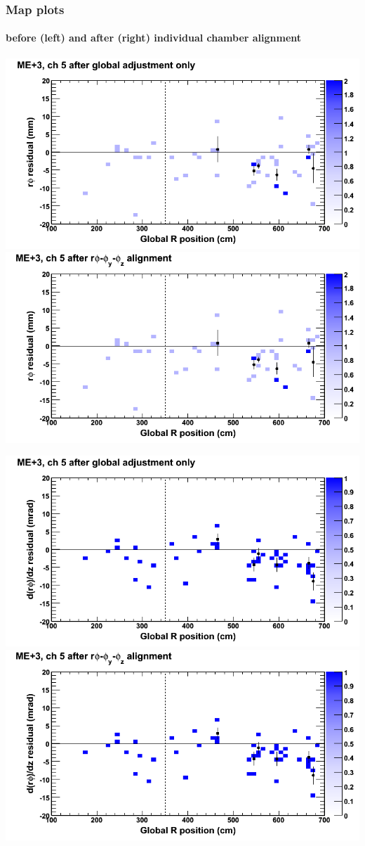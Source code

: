 \documentclass[compress]{beamer}
\begin{document}
\begin{frame}
\frametitle{Map plots}
\framesubtitle{before (left) and after (right) individual chamber alignment}
\includegraphics[width=0.5\linewidth]{ringmapplots_3dof/before_CSCvsr_mep3ch05_x.png} \includegraphics[width=0.5\linewidth]{ringmapplots_3dof/after_CSCvsr_mep3ch05_x.png}

\includegraphics[width=0.5\linewidth]{ringmapplots_3dof/before_CSCvsr_mep3ch05_dxdz.png} \includegraphics[width=0.5\linewidth]{ringmapplots_3dof/after_CSCvsr_mep3ch05_dxdz.png}
\end{frame}
\end{document}
